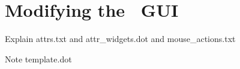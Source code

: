 \section{Modifying the \smyrna\ GUI}
\label{sec:gui}

Explain attrs.txt and attr\_widgets.dot
and  mouse\_actions.txt

Note template.dot

